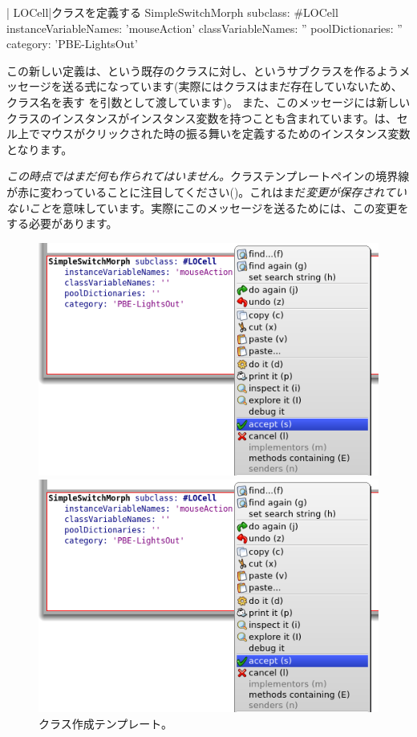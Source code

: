 \documentclass[a4paper,10pt,twoside]{book}
\begin{document}
\begin{classdef}[firstClassDef]{\ct| LOCell|クラスを定義する}
SimpleSwitchMorph subclass: #LOCell
   instanceVariableNames: 'mouseAction'
   classVariableNames: ''
   poolDictionaries: ''
   category: 'PBE-LightsOut'
\end{classdef}

この新しい定義は、という既存のクラスに対し、というサブクラスを作るようメッセージを送る\st 式になっています(実際にはクラスはまだ存在していないため、クラス名を表す を引数として渡しています)。
また、このメッセージには新しいクラスのインスタンスがインスタンス変数を持つことも含まれています。は、セル上でマウスがクリックされた時の振る舞いを定義するためのインスタンス変数となります。

\emph{この時点ではまだ何も作られてはいません。}クラステンプレートペインの境界線が赤に変わっていることに注目してください()。これはまだ\emph{変更が保存されていないこと}を意味しています。実際にこのメッセージを送るためには、この変更をする必要があります。

\begin{figure}[h!t]
\ifluluelse
	{\centerline {\includegraphics[width=\textwidth]{AcceptClassDef}}}
	{\centerline {\includegraphics[scale=0.7]{AcceptClassDef}}}
\caption{クラス作成テンプレート。
}
\end{figure}
\end{document}
